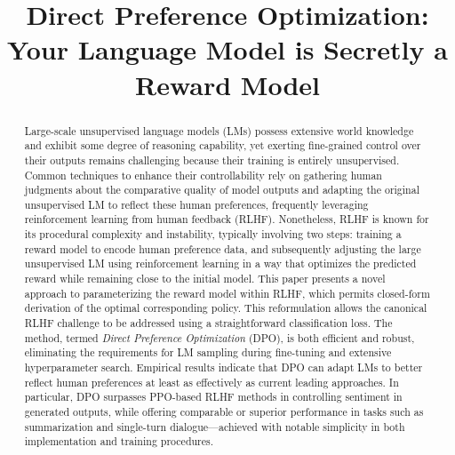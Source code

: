 \title{Direct Preference Optimization: Your Language Model is Secretly a Reward Model}

\begin{abstract}
Large-scale unsupervised language models (LMs) possess extensive world knowledge and exhibit some degree of reasoning capability, yet exerting fine-grained control over their outputs remains challenging because their training is entirely unsupervised. Common techniques to enhance their controllability rely on gathering human judgments about the comparative quality of model outputs and adapting the original unsupervised LM to reflect these human preferences, frequently leveraging reinforcement learning from human feedback (RLHF). Nonetheless, RLHF is known for its procedural complexity and instability, typically involving two steps: training a reward model to encode human preference data, and subsequently adjusting the large unsupervised LM using reinforcement learning in a way that optimizes the predicted reward while remaining close to the initial model. This paper presents a novel approach to parameterizing the reward model within RLHF, which permits closed-form derivation of the optimal corresponding policy. This reformulation allows the canonical RLHF challenge to be addressed using a straightforward classification loss. The method, termed \textit{Direct Preference Optimization} (DPO), is both efficient and robust, eliminating the requirements for LM sampling during fine-tuning and extensive hyperparameter search. Empirical results indicate that DPO can adapt LMs to better reflect human preferences at least as effectively as current leading approaches. In particular, DPO surpasses PPO-based RLHF methods in controlling sentiment in generated outputs, while offering comparable or superior performance in tasks such as summarization and single-turn dialogue—achieved with notable simplicity in both implementation and training procedures.
\end{abstract}

